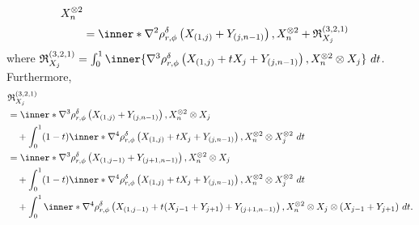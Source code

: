 \documentclass[aos]{imsart}
\begin{document}
\begin{appendix}
\begin{equation*}
\begin{aligned}
{            %
            X_n^{\otimes 2}
        } \\
    & = \inner*{
            \nabla^2 \rho_{r,\phi}^\delta\left(
              X_{(1,j)} + Y_{(j,n-1)}
            \right),
            X_n^{\otimes 2}
        } 
    + \mathfrak{R}_{X_j}^{(3,2,1)} \\
\end{aligned}
\end{equation*}
where $\mathfrak{R}_{X_j}^{(3,2,1)} = \int_0^1 \inner{
    \nabla^3 \rho_{r,\phi}^\delta\left(
        X_{(1,j)} + t X_{j} + Y_{(j, n-1)}
    \right),
    X_n^{\otimes 2} \otimes X_j
} ~dt$. Furthermore,
\begin{equation*}
\begin{aligned}
    & \mathfrak{R}_{X_j}^{(3,2,1)} \\
    & = \inner*{
            \nabla^3 \rho_{r,\phi}^\delta\left(
              X_{(1,j)} + Y_{(j,n-1)}
            \right),
            X_n^{\otimes 2} \otimes X_j
        } \\
    & \quad + \int_0^1 (1-t) \inner*{
        \nabla^4 \rho_{r,\phi}^\delta\left(
            X_{(1,j)} + t X_{j} + Y_{(j, n-1)}
        \right),
        X_n^{\otimes 2} \otimes X_j^{\otimes 2}
    } ~dt \\
    & = \inner*{
            \nabla^3 \rho_{r,\phi}^\delta\left(
              X_{(1,j-1)} + Y_{(j+1,n-1)}
            \right),
            X_n^{\otimes 2} \otimes X_j
        } \\
    & \quad + \int_0^1 (1-t) \inner*{
        \nabla^4 \rho_{r,\phi}^\delta\left(
            X_{(1,j)} + t X_{j} + Y_{(j, n-1)}
        \right),
        X_n^{\otimes 2} \otimes X_j^{\otimes 2}
    } ~dt \\
    & \quad + \int_0^1 \inner*{
        \nabla^4 \rho_{r,\phi}^\delta\left(
            X_{(1,j-1)} + t (X_{j-1} + Y_{j+1}) + Y_{(j+1, n-1)}
        \right),
        X_n^{\otimes 2} \otimes X_j \otimes (X_{j-1} + Y_{j+1})
    } ~dt.
\end{aligned}

\end{equation*}
\end{appendix}
\end{document}

